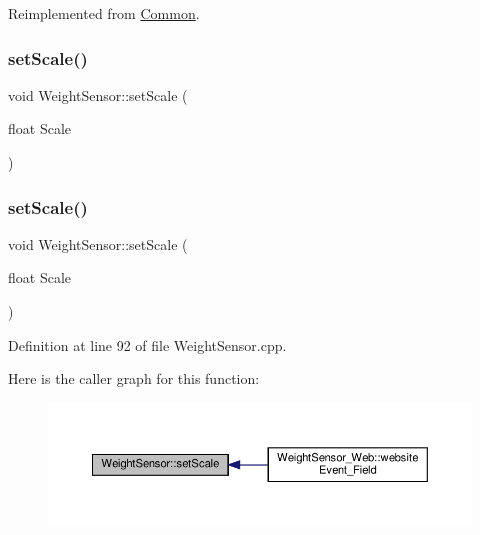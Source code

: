 Reimplemented from \hyperlink{class_common_a9e60e2c26a5f4d72342a59a969954636}{Common}.

\mbox{\label{class_weight_sensor_aa190a87fa5e384d2ead40c99116dc8a7}} 
\subsubsection{\texorpdfstring{set\+Scale()}{setScale()}\hspace{0.1cm}{\footnotesize\ttfamily [1/2]}}
{\footnotesize\ttfamily void Weight\+Sensor\+::set\+Scale (\begin{DoxyParamCaption}\item[{float}]{Scale }\end{DoxyParamCaption})\hspace{0.3cm}{\ttfamily [protected]}}

\mbox{\label{class_weight_sensor_aa190a87fa5e384d2ead40c99116dc8a7}} 
\subsubsection{\texorpdfstring{set\+Scale()}{setScale()}\hspace{0.1cm}{\footnotesize\ttfamily [2/2]}}
{\footnotesize\ttfamily void Weight\+Sensor\+::set\+Scale (\begin{DoxyParamCaption}\item[{float}]{Scale }\end{DoxyParamCaption})\hspace{0.3cm}{\ttfamily [protected]}}



Definition at line 92 of file Weight\+Sensor.\+cpp.

Here is the caller graph for this function\+:
\nopagebreak
\begin{figure}[H]
\begin{center}
\leavevmode
\includegraphics[width=350pt]{class_weight_sensor_aa190a87fa5e384d2ead40c99116dc8a7_icgraph}
\end{center}
\end{figure}
\mbox{\label{class_weight_sensor_a02fe54254ed51deefc115fad34053061}} 
